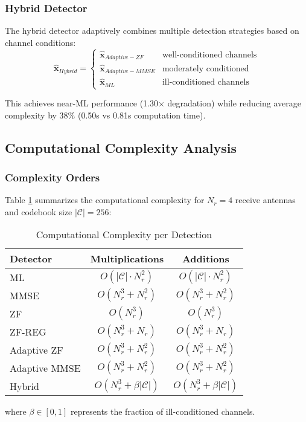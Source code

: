 \subsubsection{Hybrid Detector}
The hybrid detector adaptively combines multiple detection strategies based on channel conditions:
\begin{equation}
\hat{\mathbf{x}}_{Hybrid} = \begin{cases}
\hat{\mathbf{x}}_{Adaptive-ZF} & \text{well-conditioned channels} \\
\hat{\mathbf{x}}_{Adaptive-MMSE} & \text{moderately conditioned} \\
\hat{\mathbf{x}}_{ML} & \text{ill-conditioned channels}
\end{cases}
\end{equation}

This achieves near-ML performance (1.30× degradation) while reducing average complexity by 38\% (0.50s vs 0.81s computation time).

\subsection{Computational Complexity Analysis}

\subsubsection{Complexity Orders}
Table \ref{tab:complexity} summarizes the computational complexity for $N_r = 4$ receive antennas and codebook size $|\mathcal{C}| = 256$:

\begin{table}[h]
\caption{Computational Complexity per Detection}
\label{tab:complexity}
\centering
\begin{tabular}{|l|c|c|}
\hline
\textbf{Detector} & \textbf{Multiplications} & \textbf{Additions} \\
\hline
ML & $O(|\mathcal{C}| \cdot N_r^2)$ & $O(|\mathcal{C}| \cdot N_r^2)$ \\
MMSE & $O(N_r^3 + N_r^2)$ & $O(N_r^3 + N_r^2)$ \\
ZF & $O(N_r^3)$ & $O(N_r^3)$ \\
ZF-REG & $O(N_r^3 + N_r)$ & $O(N_r^3 + N_r)$ \\
Adaptive ZF & $O(N_r^3 + N_r^2)$ & $O(N_r^3 + N_r^2)$ \\
Adaptive MMSE & $O(N_r^3 + N_r^2)$ & $O(N_r^3 + N_r^2)$ \\
Hybrid & $O(N_r^3 + \beta|\mathcal{C}|)$ & $O(N_r^3 + \beta|\mathcal{C}|)$ \\
\hline
\end{tabular}
\end{table}
where $\beta \in [0,1]$ represents the fraction of ill-conditioned channels.

